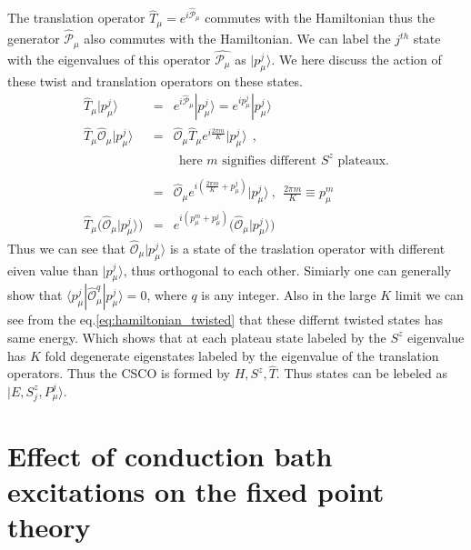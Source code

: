\documentclass[reprint,prb,superscriptaddress]{revtex4-2}
\begin{document}
\noindent The translation operator $\hat{T}_{\mu}=e^{i\hat{\mathcal{P}}_{\mu}}$ commutes with the Hamiltonian thus the generator $\hat{\mathcal{P}}_{\mu}$ also commutes with the Hamiltonian. We can label the $j^{th}$ state with the eigenvalues of this operator $\hat{\mathcal{P}_{\mu}}$ as $|p^{j}_{\mu}\rangle$. We here discuss the action of these twist and translation operators on these states.
\begin{eqnarray}
\hat{T}_{\mu} |p^j_{\mu} \rangle &=& e^{i\hat{\mathcal{P}}_{\mu}} |p^j_{\mu} \rangle = e^{ip^j_{\mu}} |p^j_{\mu}\rangle \nonumber\\
\hat{T}_{\mu} \hat{\mathcal{O}}_{\mu} |p^j_{\mu} \rangle &=&  \hat{\mathcal{O}}_{\mu} \hat{T}_{\mu} e^{i\frac{2\pi m}{K}} |p^j_{\mu}\rangle~~, \nonumber\\
&&~~\textrm{here $m$ signifies different $S^z$ plateaux.} \nonumber\\ \nonumber\\
&=& \hat{\mathcal{O}}_{\mu}   e^{i(\frac{2\pi m}{K}+p_{\mu}^j)} |p^j_{\mu}\rangle~,~~ \frac{2\pi m}{K} \equiv p_{\mu}^{m} \nonumber\\
\hat{T}_{\mu} \bigg( \hat{\mathcal{O}}_{\mu} |p^j_{\mu} \rangle  \bigg) &=& e^{i(p_{\mu}^{m}+p_{\mu}^j)} \bigg( \hat{\mathcal{O}}_{\mu}    |p^j_{\mu}\rangle \bigg)    
\end{eqnarray}
Thus we can see that  $\hat{\mathcal{O}}_{\mu} |p^j_{\mu} \rangle $ is a state of the traslation operator with different eiven value than $|p^j_{\mu} \rangle $, thus orthogonal to each other. Simiarly one can generally show that $\langle p^j_{\mu} | \hat{\mathcal{O}}^{q}_{\mu} |p^j_{\mu} \rangle=0$, where $q$ is any integer. Also in the large $K$ limit we can see from the eq.\eqref{eq:hamiltonian_twisted} that these differnt twisted states has same energy. Which shows that at each plateau state labeled by the $S^z$ eigenvalue has $K$ fold degenerate eigenstates labeled by the eigenvalue of the translation operators. Thus the CSCO is formed by $H,S^z,\hat{T}$. Thus states can be lebeled as  $|E,S^z_j,P^j_{\mu}\rangle$. 




\section{Effect of conduction bath excitations on the fixed point theory}
\end{document}
